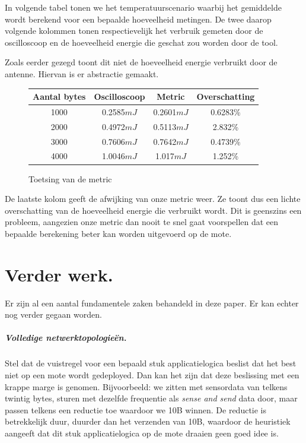 \documentclass[11pt]{article}
\begin{document}
In volgende tabel tonen we het temperatuurscenario waarbij het gemiddelde wordt
berekend voor een bepaalde hoeveelheid metingen. De twee daarop volgende
kolommen tonen respectievelijk het verbruik gemeten door de oscilloscoop en de
hoeveelheid energie die geschat zou worden door de tool.

Zoals eerder gezegd toont dit niet de hoeveelheid energie verbruikt door de antenne. Hiervan is er abstractie gemaakt. 

\begin{figure}[H]
\begin{tabular}{|c|c|c|c|}
\hline 
\cellcolor[gray]{0.8}Aantal bytes & \cellcolor[gray]{0.8} Oscilloscoop  & \cellcolor[gray]{0.8} Metric & \cellcolor[gray]{0.8} Overschatting \\ 
\hline 
1000 & 0.2585$mJ$ & 0.2601$mJ$ & 0.6283\% \\ 
\hline 
2000 & 0.4972$mJ$ & 0.5113$mJ$ & 2.832\% \\ 
\hline 
3000 & 0.7606$mJ$ & 0.7642$mJ$ & 0.4739\% \\ 
\hline 
4000 & 1.0046$mJ$ & 1.017$mJ$ & 1.252\% \\ 
\hline 
\end{tabular} 

\caption{Toetsing van de metric}
\label{tab:toetsing}
\end{figure}

De laatste kolom geeft de afwijking van onze metric weer. Ze toont dus een
lichte overschatting van de hoeveelheid energie die verbruikt wordt. Dit is
geenszins een probleem, aangezien onze metric dan nooit te snel gaat voorspellen dat
een bepaalde berekening beter kan worden uitgevoerd op de mote.

\section{Verder werk.} 

Er zijn al een aantal fundamentele zaken behandeld in deze paper. Er kan
echter nog verder gegaan worden.
 
\subparagraph{Volledige netwerktopologie\"en.}

Stel dat de vuistregel voor een bepaald stuk applicatielogica beslist dat het
best niet op een mote wordt gedeployed. Dan kan het zijn dat deze beslissing met
een krappe marge is genomen. Bijvoorbeeld: we zitten met sensordata van telkens
twintig bytes, sturen met dezelfde frequentie als \textit{sense and send} data door, maar
passen telkens een reductie toe waardoor we 10B winnen. De reductie is
betrekkelijk duur, duurder dan het verzenden van 10B, waardoor de heuristiek
aangeeft dat dit stuk applicatielogica op de mote draaien geen goed idee is. 
\end{document}
